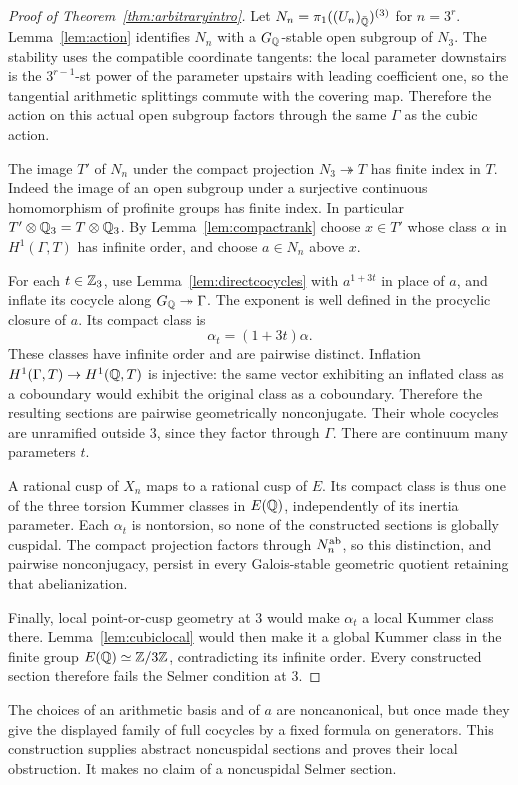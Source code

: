 \begin{proof}[Proof of Theorem~\ref{thm:arbitraryintro}]
Let $N_n=\pi_1((U_n)_{\bar{\mathbb Q}})^{(3)}$ for $n=3^r$.
Lemma~\ref{lem:action} identifies $N_n$ with a $G_\mathbb Q$-stable open
subgroup of $N_3$. The stability uses the compatible coordinate
tangents: the local parameter downstairs is the
$3^{r-1}$-st power of the parameter upstairs with leading
coefficient one, so the tangential arithmetic splittings commute
with the covering map. Therefore the action on this actual open
subgroup factors through the same $\Gamma$ as the cubic action.

The image $T'$ of $N_n$ under the compact projection
$N_3\twoheadrightarrow T$ has finite index in $T$. Indeed the
image of an open subgroup under a surjective continuous
homomorphism of profinite groups has finite index. In particular
$T'\otimes\mathbb Q_3=T\otimes\mathbb Q_3$. By Lemma~\ref{lem:compactrank}
choose $x\in T'$ whose class $\alpha$ in $H^1(\Gamma,T)$ has
infinite order, and choose $a\in N_n$ above $x$.

For each $t\in\mathbb Z_3$, use Lemma~\ref{lem:directcocycles} with
$a^{1+3t}$ in place of $a$, and inflate its cocycle along
$G_\mathbb Q\twoheadrightarrow\Gamma$. The exponent is well defined
in the procyclic closure of $a$. Its compact class is
\[
\alpha_t=(1+3t)\alpha.
\]
These classes have infinite order and are pairwise distinct.
Inflation $H^1(\Gamma,T)\to H^1(\mathbb Q,T)$ is injective: the same
vector exhibiting an inflated class as a coboundary would exhibit
the original class as a coboundary. Therefore the resulting
sections are pairwise geometrically nonconjugate. Their whole
cocycles are unramified outside $3$, since they factor through
$\Gamma$. There are continuum many parameters $t$.

A rational cusp of $X_n$ maps to a rational cusp of $E$. Its
compact class is thus one of the three torsion Kummer classes
in $E(\mathbb Q)$, independently of its inertia parameter. Each
$\alpha_t$ is nontorsion, so none of the constructed sections
is globally cuspidal. The compact projection factors through
$N_n^{\mathrm{ab}}$, so this distinction, and pairwise nonconjugacy,
persist in every Galois-stable geometric quotient retaining that
abelianization.

Finally, local point-or-cusp geometry at $3$ would make
$\alpha_t$ a local Kummer class there. Lemma~\ref{lem:cubiclocal}
would then make it a global Kummer class in the finite group
$E(\mathbb Q)\simeq\mathbb Z/3\mathbb Z$, contradicting its infinite order.
Every constructed section therefore fails the Selmer condition
at $3$.
\end{proof}

The choices of an arithmetic basis and of $a$ are noncanonical, but
once made they give the displayed family of full cocycles by a fixed
formula on generators. This construction supplies abstract
noncuspidal sections and proves their local obstruction. It makes
no claim of a noncuspidal Selmer section.


